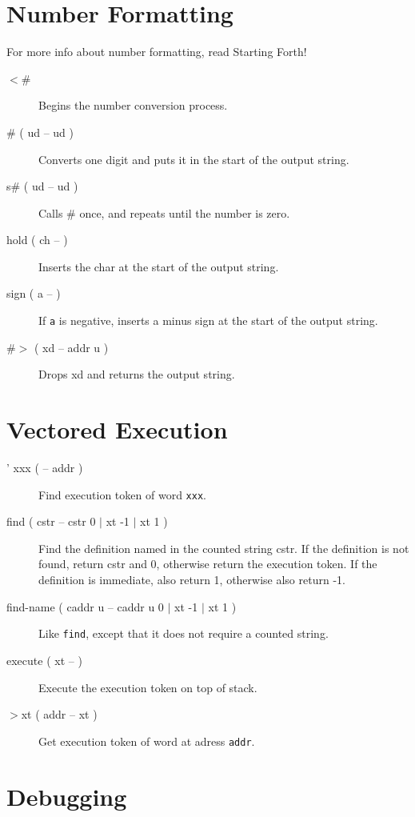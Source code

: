 \section{Number Formatting}

For more info about number formatting, read Starting Forth!

\begin{description}

\item[$<$\#] Begins the number conversion process.
\item[\# ( ud -- ud )] Converts one digit and puts it in the start of the output string.
\item[s\# ( ud -- ud )] Calls \# once, and repeats until the number is zero.
\item[hold ( ch -- )] Inserts the char at the start of the output string.
\item[sign ( a -- )] If \texttt{a} is negative, inserts a minus sign at the start of the output string.
\item[\#$>$ ( xd -- addr u )] Drops xd and returns the output string.

\end{description}

\section{Vectored Execution}

\begin{description}
\item[' xxx ( -- addr )] Find execution token of word \texttt{xxx}.
\item[find ( cstr -- cstr 0 $\vert$ xt -1 $\vert$ xt 1 )] Find the definition named in the counted string cstr. If the definition is not found, return cstr and 0, otherwise return the execution token. If the definition is immediate, also return 1, otherwise also return -1.
\item[find-name ( caddr u -- caddr u 0 $\vert$ xt -1 $\vert$ xt 1 )] Like \texttt{find}, except that it does not require a counted string.
\item[execute ( xt -- )] Execute the execution token on top of stack.
\item[$>$xt ( addr -- xt )] Get execution token of word at adress \texttt{addr}.

\end{description}

\section{Debugging}

